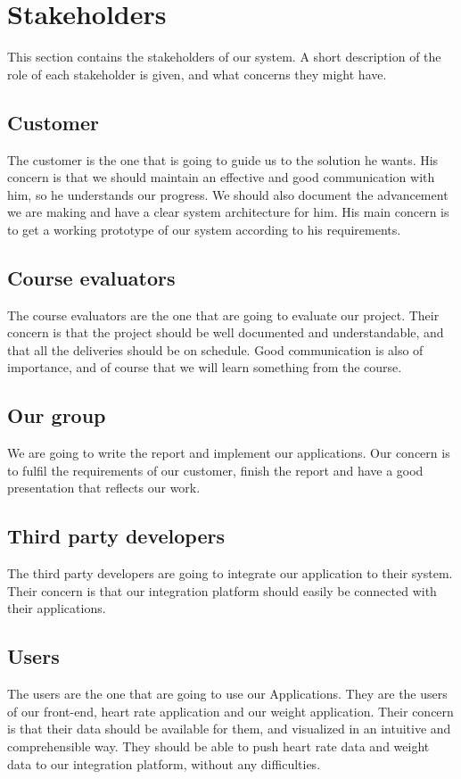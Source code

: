 
\section{Stakeholders}
\label{section:stakeholders}

This section contains the stakeholders of our system.
A short description of the role of each stakeholder is given, and what concerns they might have.

\subsection{Customer}
The customer is the one that is going to guide us to the solution he wants.
His concern is that we should maintain an effective and good communication with him, so he understands our progress.
We should also document the advancement we are making and have a clear system architecture for him.
His main concern is to get a working prototype of our system according to his requirements.

\subsection{Course evaluators}
The course evaluators are the one that are going to evaluate our project. 
Their concern is that the project should be well documented and understandable, and that all the deliveries should be on schedule.
Good communication is also of importance, and of course that we will learn something from the course.

\subsection{Our group}
We are going to write the report and implement our applications.
Our concern is to fulfil the requirements of our customer, finish the report and have a good presentation that reflects our work.

\subsection{Third party developers}
The third party developers are going to integrate our application to their system.
Their concern is that our integration platform should easily be connected with their applications.

\subsection{Users}
The users are the one that are going to use our Applications.
They are the users of our front-end, heart rate application and our weight application.
Their concern is that their data should be available for them, and visualized in an intuitive and comprehensible way.
They should be able to push heart rate data and weight data to our integration platform, without any difficulties.


